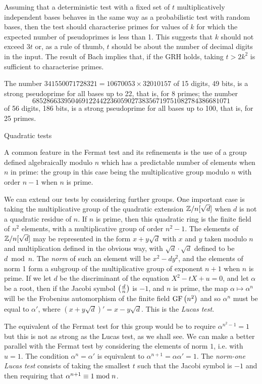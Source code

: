 Assuming that a deterministic test with a fixed set of $t$ multiplicatively
independent bases behaves in the same way as a probabilistic test with random
bases, then the test should characterise primes for values of $k$ for
which the expected number of pseudoprimes is less than 1.  This suggests that $k$
should not exceed $3t$ or, as a rule of thumb, $t$ should be about the
number of decimal digits in the input.  The result of Bach implies that, if the
GRH holds, taking $t > 2k^2$ is sufficient to characterise primes.

The number $341550071728321 = 10670053 \times 32010157$ of 15 digits, 49 bits,
is a strong pseudoprime for all bases up to 22, that is, for 8 primes;
the number
$$68528663395046912244223605902738356719751082784386681071$$
of 56 digits, 186 bits, is a strong pseudoprime for all bases up to 100, 
that is, for 25 primes.


\subhead Quadratic tests \endsubhead

A common feature in the Fermat test and its refinements is the use of a
group defined algebraically modulo $n$ which has a predictable number of
elements when $n$ in prime: the group in this case being the multiplicative
group modulo $n$ with order $n-1$ when $n$ is prime.

We can extend our tests by considering further groups.  One important case
is taking the multiplicative group of the quadratic extension ${\Bbb Z}/n[\sqrt{d}]$
when $d$ is not a quadratic residue of $n$.  If $n$ is prime, then this quadratic
ring is the finite field of $n^2$ elements, with a multiplicative group of
order $n^2 -1$.  The elements of ${\Bbb Z}/n[\sqrt{d}]$ may be represented in the
form $x + y \sqrt{d}$ with $x$ and $y$ taken modulo $n$ and multiplication
defined in the obvious way, with $\sqrt{d} \cdot \sqrt{d}$ defined to be $d \bmod n$.
The {\it norm} of such an element will be $x^2 - d y^2$, and the elements of norm
1 form a subgroup of the multiplicative group of exponent $n+1$ when $n$ is prime.
If we let $d$ be the discriminant of the equation $X^2 - tX + u = 0$, and let
$\alpha$ be a root, then if the Jacobi symbol $\left({d \over n}\right)$ is $-1$,
and $n$ is prime, the map $\alpha \mapsto \alpha^n$ will
be the Frobenius automorphism of the finite field $\GF(n^2)$ and so $\alpha^n$ must be
equal to $\alpha'$, where $(x + y \sqrt{d})' = x - y \sqrt{d}$.  This is the
{\it Lucas test}.  

The equivalent of the Fermat test for this group would be to
require $\alpha^{n^2-1} = 1$ but this is not as strong as the Lucas test, 
as we shall see.  We can make a better parallel with the Fermat test by
considering the elements of norm $1$, i.e. with $u = 1$.  The condition
$\alpha^n = \alpha'$ is equivalent to $\alpha^{n+1} = \alpha\alpha' = 1$.
The {\it norm-one Lucas test} consists of taking the smallest $t$ such that the
Jacobi symbol is $-1$ and then requiring that $\alpha^{n+1} \equiv 1 \bmod n$.

